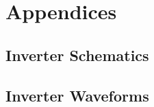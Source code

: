 \documentclass[11pt,titlepage]{report}
\begin{document}
\chapter{Appendices}
\section{Inverter Schematics}
\label{app:schematics}


\section{Inverter Waveforms}
\label{app:waveforms}
\end{document}
